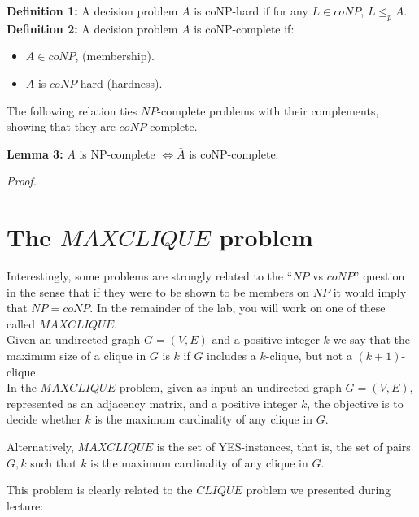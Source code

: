 \documentclass{cs0500}
\begin{document}
\noindent\textbf{Definition 1:} A decision problem $A$ is coNP-hard if for any $L\in coNP$, $L\leq_p A$.\\

\noindent\textbf{Definition 2:} A decision problem $A$ is coNP-complete if:
\begin{itemize}
    \item $A\in coNP$, (membership).
    \item $A$ is $coNP$-hard (hardness).
\end{itemize}

The following relation ties $NP$-complete problems with their complements, showing that they are $coNP$-complete.
\begin{problem}
\noindent\textbf{Lemma 3:} $A$ is NP-complete $\iff \bar{A}$ is coNP-complete.
\end{problem}
\noindent\emph{Proof.}
\newpage

\section{The $MAXCLIQUE$ problem}
Interestingly, some problems are strongly related to the ``$NP$ vs $coNP$'' question in the sense that if they were to be shown to be members on $NP$ it would imply that 
$NP=coNP$. In the remainder of the lab, you will work on one of these called $MAXCLIQUE$.\\

Given an undirected graph $G=(V,E)$ and a positive integer $k$ we say that the maximum size of a clique in $G$ is $k$ if $G$ includes a $k$-clique, but not a $(k+1)$-clique.\\

In the $MAXCLIQUE$ problem, given as input an undirected graph $G=(V,E)$, represented as an adjacency matrix, and a positive integer $k$, the objective is to decide whether $k$ is the maximum cardinality of any clique in $G$.

Alternatively, $MAXCLIQUE$ is the set of YES-instances, that is, the set of pairs $G,k$ such that $k$ is the maximum cardinality of any clique in $G$.

This problem is clearly related to the $CLIQUE$ problem we presented during lecture:
\end{document}
